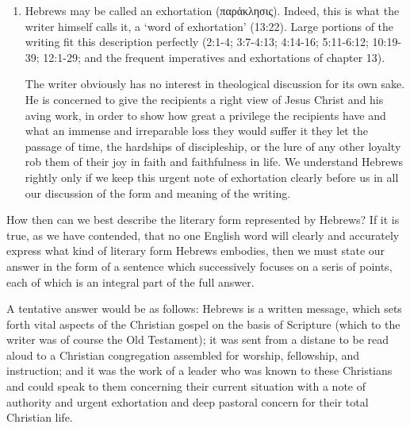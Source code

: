 \begin{enumerate}
\item Hebrews may be called an exhortation (παρἀκλησις).
Indeed, this is what the writer himself calls it, a `word of exhortation'
(13:22).
Large portions of the writing fit this description perfectly (2:1-4; 3:7-4:13;
4:14-16; 5:11-6:12; 10:19-39; 12:1-29; and the frequent imperatives and
exhortations of chapter 13).
\newline

The writer obviously has no interest in theological discussion for its own sake.
He is concerned to give the recipients a right view of Jesus Christ and his
aving work, in order to show how great a privilege the recipients have and what
an immense and irreparable loss they would suffer it they let the passage of
time, the hardships of discipleship, or the lure of any other loyalty rob them
of their joy in faith and faithfulness in life.
We understand Hebrews rightly only if we keep this urgent note of exhortation
clearly before us in all our discussion of the form and meaning of the writing.
\end{enumerate}

How then can we best describe the literary form represented by Hebrews?
If it is true, as we have contended, that no one English word will clearly and
accurately express what kind of literary form Hebrews embodies, then we must
state our answer in the form of a sentence which successively focuses on a seris
of points, each of which is an integral part of the full answer.
\newline

A tentative answer would be as follows: Hebrews is a written message, which sets
forth vital aspects of the Christian gospel on the basis of Scripture (which to
the writer was of course the Old Testament); it was sent from a distane to be
read aloud to a Christian congregation assembled for worship, fellowship, and
instruction; and it was the work of a leader who was known to these Christians
and could speak to them concerning their current situation with a note of
authority and urgent exhortation and deep pastoral concern for their total
Christian life.
